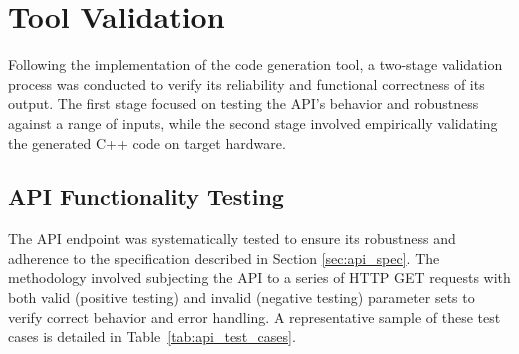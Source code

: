 
\section{Tool Validation}
\label{sec:tool_validation}

  Following the implementation of the code generation tool, a two-stage validation process was conducted to verify its reliability and functional correctness of its output. The first stage focused on testing the API's behavior and robustness against a range of inputs, while the second stage involved empirically validating the generated C++ code on target hardware.

\subsection{API Functionality Testing}
\label{subsec:api_testing}

  The API endpoint was systematically tested to ensure its robustness and adherence to the specification described in Section \ref{sec:api_spec}. The methodology involved subjecting the API to a series of HTTP GET requests with both valid (positive testing) and invalid (negative testing) parameter sets to verify correct behavior and error handling. A representative sample of these test cases is detailed in Table~\ref{tab:api_test_cases}.


